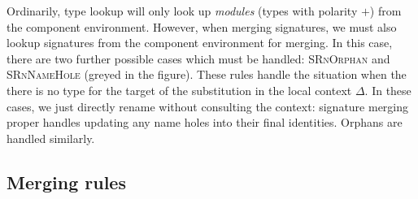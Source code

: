 
Ordinarily, type lookup will only look up \emph{modules} (types
with polarity $+$) from the component environment.  However, when merging
signatures, we must also lookup signatures from the component environment
for merging.  In this case, there are two further possible cases which
must be handled: \textsc{SRnOrphan} and \textsc{SRnNameHole} (greyed in
the figure).  These rules handle the situation when the there is no
type for the target of the substitution in the local context $\Delta$.
In these cases, we just directly rename without consulting the context:
signature merging proper handles updating any name holes into their
final identities.  Orphans are handled similarly.




\subsection{Merging rules}



